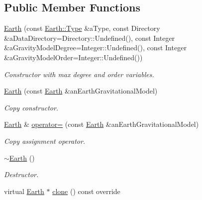 \subsection*{Public Member Functions}
\begin{DoxyCompactItemize}
\item 
\hyperlink{classostk_1_1physics_1_1environment_1_1gravitational_1_1_earth_a65816e63e9212691bb689d01bffb6755}{Earth} (const \hyperlink{classostk_1_1physics_1_1environment_1_1gravitational_1_1_earth_a9895df78b5c5aab5e981bf765f8c0f05}{Earth\+::\+Type} \&a\+Type, const Directory \&a\+Data\+Directory=Directory\+::\+Undefined(), const Integer \&a\+Gravity\+Model\+Degree=Integer\+::\+Undefined(), const Integer \&a\+Gravity\+Model\+Order=Integer\+::\+Undefined())
\begin{DoxyCompactList}\small\item\em Constructor with max degree and order variables. \end{DoxyCompactList}\item 
\hyperlink{classostk_1_1physics_1_1environment_1_1gravitational_1_1_earth_a821f98411c65f59e6a297c6bcc3de291}{Earth} (const \hyperlink{classostk_1_1physics_1_1environment_1_1gravitational_1_1_earth}{Earth} \&an\+Earth\+Gravitational\+Model)
\begin{DoxyCompactList}\small\item\em Copy constructor. \end{DoxyCompactList}\item 
\hyperlink{classostk_1_1physics_1_1environment_1_1gravitational_1_1_earth}{Earth} \& \hyperlink{classostk_1_1physics_1_1environment_1_1gravitational_1_1_earth_accc913e0c0a5c7c8348c13217c5de4f3}{operator=} (const \hyperlink{classostk_1_1physics_1_1environment_1_1gravitational_1_1_earth}{Earth} \&an\+Earth\+Gravitational\+Model)
\begin{DoxyCompactList}\small\item\em Copy assignment operator. \end{DoxyCompactList}\item 
\hyperlink{classostk_1_1physics_1_1environment_1_1gravitational_1_1_earth_a0bd1037605f6fb37fb6babc7bb8ae745}{$\sim$\+Earth} ()
\begin{DoxyCompactList}\small\item\em Destructor. \end{DoxyCompactList}\item 
virtual \hyperlink{classostk_1_1physics_1_1environment_1_1gravitational_1_1_earth}{Earth} $\ast$ \hyperlink{classostk_1_1physics_1_1environment_1_1gravitational_1_1_earth_a987c2df62d8fedb368acf37e71ba7a47}{clone} () const override

\end{DoxyCompactItemize}
